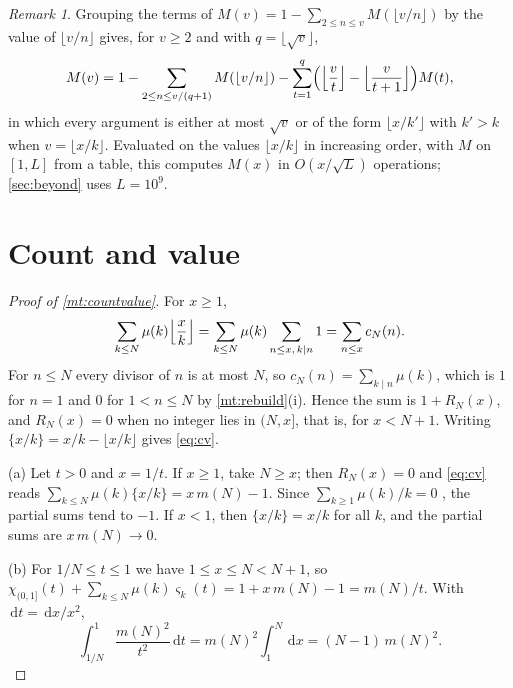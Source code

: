 \documentclass[11pt]{article}
\theoremstyle{definition}\newtheorem{definition}[theorem]{Definition}
\theoremstyle{remark}\newtheorem{remark}[theorem]{Remark}
\newcommand{\dd}{\,\mathrm d}\newcommand{\e}{\mathrm e}
\newcommand{\fr}[1]{\{#1\}}
\begin{document}
\begin{remark}\label{rem:recursion}
Grouping the terms of $M(v)=1-\sum_{2\le n\le v}M(\lfloor v/n\rfloor)$ by the value of $\lfloor v/n\rfloor$ gives, for $v\ge2$ and with $q=\lfloor\sqrt v\rfloor$,
\[
M(v)=1-\sum_{2\le n\le v/(q+1)}M(\lfloor v/n\rfloor)-\sum_{t=1}^{q}\Bigl(\Bigl\lfloor\frac vt\Bigr\rfloor-\Bigl\lfloor\frac v{t+1}\Bigr\rfloor\Bigr)M(t),
\]
in which every argument is either at most $\sqrt v$ or of the form $\lfloor x/k'\rfloor$ with $k'>k$ when $v=\lfloor x/k\rfloor$. Evaluated on the values $\lfloor x/k\rfloor$ in increasing order, with $M$ on $[1,L]$ from a table, this computes $M(x)$ in $O(x/\sqrt L)$ operations; \cref{sec:beyond} uses $L=10^9$.
\end{remark}

\section{Count and value}\label{sec:cv}

\begin{proof}[Proof of \cref{mt:countvalue}]
For $x\ge1$,
\[
\sum_{k\le N}\mu(k)\Bigl\lfloor\frac xk\Bigr\rfloor=\sum_{k\le N}\mu(k)\sum_{n\le x,\,k\mid n}1=\sum_{n\le x}c_N(n).
\]
For $n\le N$ every divisor of $n$ is at most $N$, so $c_N(n)=\sum_{k\mid n}\mu(k)$, which is $1$ for $n=1$ and $0$ for $1<n\le N$ by \cref{mt:rebuild}(i). Hence the sum is $1+R_N(x)$, and $R_N(x)=0$ when no integer lies in $(N,x]$, that is, for $x<N+1$. Writing $\fr{x/k}=x/k-\lfloor x/k\rfloor$ gives \eqref{eq:cv}.

(a) Let $t>0$ and $x=1/t$. If $x\ge1$, take $N\ge x$; then $R_N(x)=0$ and \eqref{eq:cv} reads $\sum_{k\le N}\mu(k)\fr{x/k}=x\,m(N)-1$. Since $\sum_{k\ge1}\mu(k)/k=0$ \cite[Ch.~4]{Apostol}, the partial sums tend to $-1$. If $x<1$, then $\fr{x/k}=x/k$ for all $k$, and the partial sums are $x\,m(N)\to0$.

(b) For $1/N\le t\le1$ we have $1\le x\le N<N+1$, so $\chi_{(0,1]}(t)+\sum_{k\le N}\mu(k)\varsigma_k(t)=1+x\,m(N)-1=m(N)/t$. With $\dd t=\dd x/x^2$,
\[
\int_{1/N}^1\frac{m(N)^2}{t^2}\dd t=m(N)^2\int_1^N\dd x=(N-1)\,m(N)^2.
\]
\end{proof}
\end{document}
